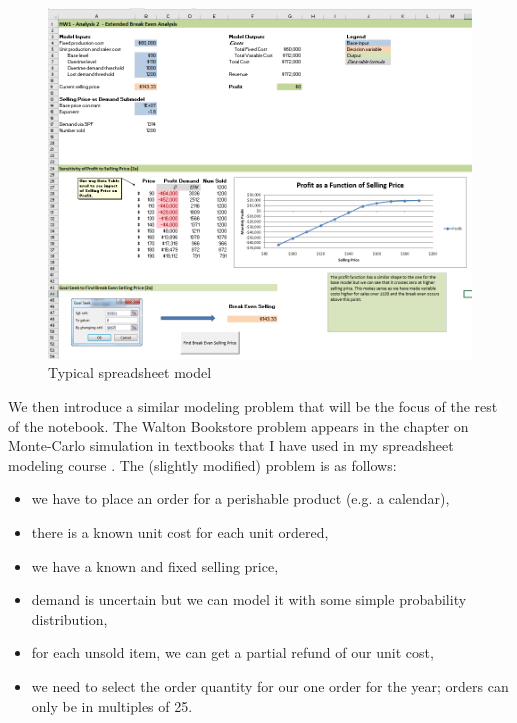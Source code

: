 \documentclass[ited,blindrev]{informs3}              %
\begin{document}
\begin{figure}[!ht]
	\centering
	\begin{minipage}{.80\textwidth}
		\includegraphics[width=1.0\textwidth]{images/output_2_0.png}
	\end{minipage}
	\caption{Typical spreadsheet model}
	\label{fig:xl_model}
\end{figure}

We then introduce a similar modeling problem that will be the focus of the rest of the notebook. The Walton Bookstore problem appears in the chapter on Monte-Carlo simulation in textbooks that I have used in my spreadsheet modeling course \cite{albrightBusinessAnalyticsData2016,winstonPracticalManagementScience2018}. The (slightly modified) problem is as follows:

\begin{itemize}
	\item we have to place an order for a perishable product (e.g. a calendar),
	\item there is a known unit cost for each unit ordered,
	\item we have a known and fixed selling price,
	\item demand is uncertain but we can model it with some simple probability distribution,
	\item for each unsold item, we can get a partial refund of our unit cost,
	\item we need to select the order quantity for our one order for the year; orders can only be in multiples of 25.
\end{itemize}
\end{document}
